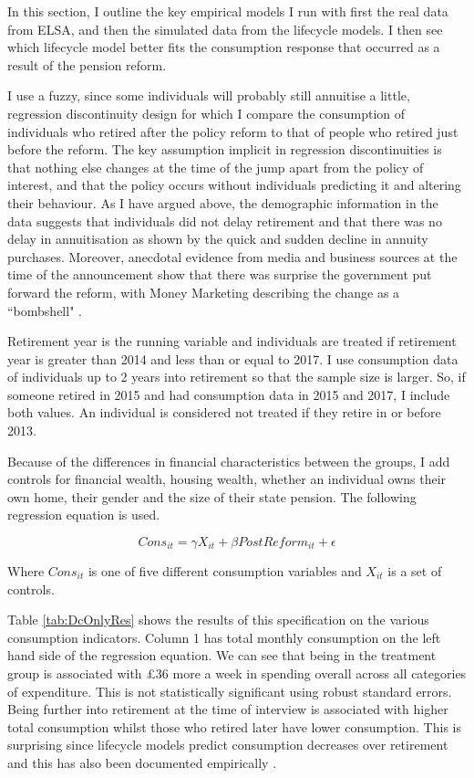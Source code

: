 \documentclass[12pt]{article}
\begin{document}
In this section, I outline the key empirical models I run with first the real
data from ELSA, and then the simulated data from the lifecycle models. I then
see which lifecycle model better fits the consumption response that occurred as
a result of the pension reform.

I use a fuzzy, since some individuals will probably still annuitise a little,
regression discontinuity design for which I compare the consumption of
individuals who retired after the policy reform to that of people who retired
just before the reform. The key assumption implicit in regression
discontinuities is that nothing else changes at the time of the jump apart from
the policy of interest, and that the policy occurs without individuals
predicting it and altering their behaviour. As I have argued above, the
demographic information in the data suggests that individuals did not delay
retirement and that there was no delay in annuitisation as shown by the quick
and sudden decline in annuity purchases. Moreover, anecdotal evidence from media
and business sources at the time of the announcement show that there was
surprise the government put forward the reform, with Money Marketing describing
the change as a ``bombshell" \citep{money_marketing_announcement}.

Retirement year is the running variable and individuals are treated if
retirement year is greater than 2014 and less than or equal to 2017. I use
consumption data of individuals up to 2 years into retirement so that the sample
size is larger. So, if someone retired in 2015 and had consumption data in 2015
and 2017, I include both values. An individual is considered not treated if they
retire in or before 2013.

Because of the differences in financial characteristics between the groups, I
add controls for financial wealth, housing wealth, whether an individual owns
their own home, their gender and the size of their state pension. The following
regression equation is used.

\begin{equation*}
    Cons_{it} =  \gamma X_{it} + \beta PostReform_{it} + \epsilon
\end{equation*}

Where $Cons_{it}$ is one of five different consumption variables and $X_{it}$ is
a set of controls.

Table \ref{tab:DcOnlyRes} shows the results of this specification on the various
consumption indicators. Column 1 has total monthly consumption on the left hand
side of the regression equation. We can see that being in the treatment group is
associated with £36 more a week in spending overall across all categories of
expenditure. This is not statistically significant using robust standard errors.
Being further into retirement at the time of interview is associated with higher
total consumption whilst those who retired later have lower consumption. This is
surprising since lifecycle models predict consumption decreases over retirement
and this has also been documented empirically \citep{hurd_rohwedder_nber_2003}.
\end{document}
